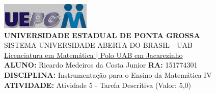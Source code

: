 \documentclass[a4paper, 12pt]{article}
\begin{document}
\includegraphics{logo}\\
\textbf{UNIVERSIDADE ESTADUAL DE PONTA GROSSA} \\
SISTEMA UNIVERSIDADE ABERTA DO BRASIL - UAB \\
\underline{Licenciatura em Matemática | Polo UAB em Jacarezinho} \\
\textbf{ALUNO:} Ricardo Medeiros da Costa Junior   \textbf{RA:} 151774301 \\
\textbf{DISCIPLINA:} Instrumentação para o Ensino da Matemática IV \\
\textbf{ATIVIDADE:} Atividade 5 - Tarefa Descritiva (Valor: 5,0) \\
\end{document}
